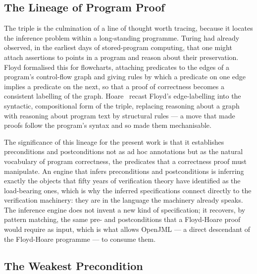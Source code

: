 \subsection{The Lineage of Program Proof}

The triple is the culmination of a line of thought worth tracing, because it
locates the inference problem within a long-standing programme. Turing had already
observed, in the earliest days of stored-program computing, that one might attach
assertions to points in a program and reason about their preservation. Floyd
formalised this for flowcharts, attaching predicates to the edges of a program's
control-flow graph and giving rules by which a predicate on one edge implies a
predicate on the next, so that a proof of correctness becomes a consistent
labelling of the graph. Hoare~\cite{hoare1969axiomatic} recast Floyd's
edge-labelling into the syntactic, compositional form of the triple, replacing
reasoning about a graph with reasoning about program text by structural rules ---
a move that made proofs follow the program's syntax and so made them mechanisable.

The significance of this lineage for the present work is that it establishes
preconditions and postconditions not as ad hoc annotations but as the natural
vocabulary of program correctness, the predicates that a correctness proof must
manipulate. An engine that infers preconditions and postconditions is inferring
exactly the objects that fifty years of verification theory have identified as the
load-bearing ones, which is why the inferred specifications connect directly to the
verification machinery: they are in the language the machinery already speaks. The
inference engine does not invent a new kind of specification; it recovers, by
pattern matching, the same pre- and postconditions that a Floyd-Hoare proof would
require as input, which is what allows OpenJML --- a direct descendant of the
Floyd-Hoare programme --- to consume them.

\subsection{The Weakest Precondition}

